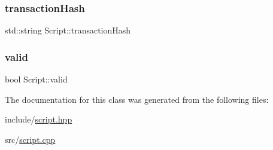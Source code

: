 \mbox{\label{classScript_a483186fc03c980f1db03cc185ea51785}} 
\subsubsection{\texorpdfstring{transaction\+Hash}{transactionHash}}
{\footnotesize\ttfamily std\+::string Script\+::transaction\+Hash\hspace{0.3cm}{\ttfamily [private]}}

\mbox{\label{classScript_a2754a6aa74c68bd58271955e157ce73a}} 
\subsubsection{\texorpdfstring{valid}{valid}}
{\footnotesize\ttfamily bool Script\+::valid\hspace{0.3cm}{\ttfamily [private]}}



The documentation for this class was generated from the following files\+:\begin{DoxyCompactItemize}
\item 
include/\mbox{\hyperlink{script_8hpp}{script.\+hpp}}\item 
src/\mbox{\hyperlink{script_8cpp}{script.\+cpp}}\end{DoxyCompactItemize}
